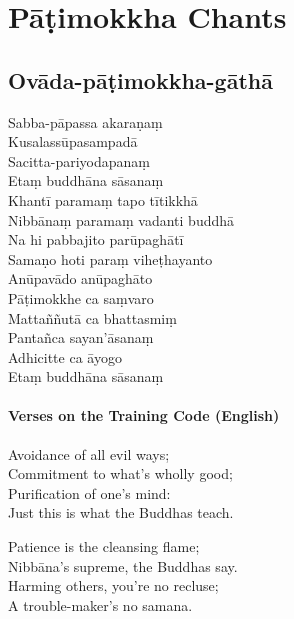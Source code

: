 \chapter{Pāṭimokkha Chants}

\section{Ovāda-pāṭimokkha-gāthā}

\begin{leader}
\end{leader}


Sabba-pāpassa akaraṇaṃ\\
Kusalassūpasampadā\\
Sacitta-pariyodapanaṃ\\
Etaṃ buddhāna sāsanaṃ\\
Khantī paramaṃ tapo tītikkhā\\
Nibbānaṃ paramaṃ vadanti buddhā\\
Na hi pabbajito parūpaghātī\\
Samaṇo hoti paraṃ viheṭhayanto\\
Anūpavādo anūpaghāto\\
Pāṭimokkhe ca saṃvaro\\
Mattaññutā ca bhattasmiṃ\\
Pantañca sayan'āsanaṃ\\
Adhicitte ca āyogo\\
Etaṃ buddhāna sāsanaṃ


\subsubsection{Verses on the Training Code (English)}

Avoidance of all evil ways;\\
Commitment to what's wholly good;\\
Purification of one's mind:\\
Just this is what the Buddhas teach.

Patience is the cleansing flame;\\
Nibbāna's supreme, the Buddhas say.\\
Harming others, you're no recluse;\\
A trouble-maker's no samana.

